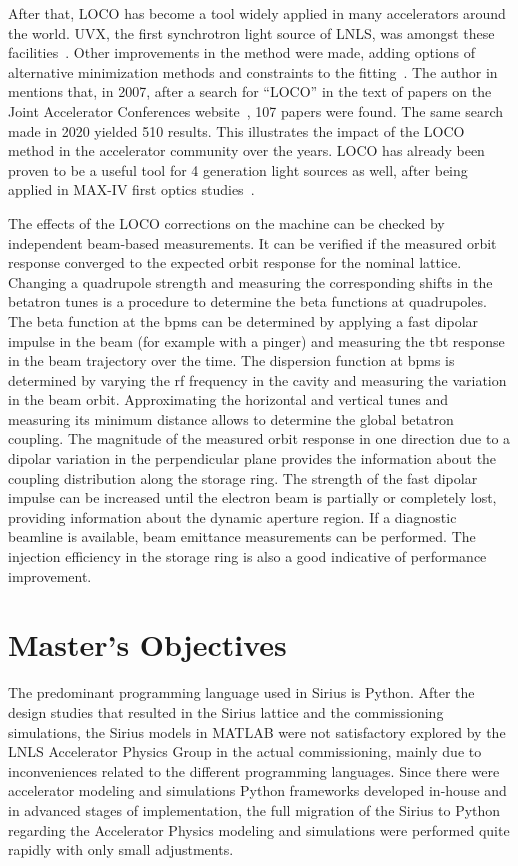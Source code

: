 After that, LOCO has become a tool widely applied in many accelerators around the world. UVX, the first synchrotron light source of LNLS, was amongst these facilities~\cite{resende2010}. Other improvements in the method were made, adding options of alternative minimization methods and constraints to the fitting~\cite{icfa_huang}. The author in~\cite{icfa_safranek} mentions that, in 2007, after a search for ``LOCO'' in the text of papers on the Joint Accelerator Conferences website~\cite{jacow}, 107 papers were found. The same search made in 2020 yielded 510 results. This illustrates the impact of the LOCO method in the accelerator community over the years. LOCO has already been proven to be a useful tool for 4 generation light sources as well, after being applied in MAX-IV first optics studies~\cite{leemann2017}.

The effects of the LOCO corrections on the machine can be checked by independent beam-based measurements. It can be verified if the measured orbit response converged to the expected orbit response for the nominal lattice. Changing a quadrupole strength and measuring the corresponding shifts in the betatron tunes is a procedure to determine the beta functions at quadrupoles. The beta function at the \glspl{bpm} can be determined by applying a fast dipolar impulse in the beam (for example with a pinger) and measuring the \gls{tbt} response in the beam trajectory over the time. The dispersion function at \glspl{bpm} is determined by varying the \gls{rf} frequency in the cavity and measuring the variation in the beam orbit. Approximating the horizontal and vertical tunes and measuring its minimum distance allows to determine the global betatron coupling. The magnitude of the measured orbit response in one direction due to a dipolar variation in the perpendicular plane provides the information about the coupling distribution along the storage ring. The strength of the fast dipolar impulse can be increased until the electron beam is partially or completely lost, providing information about the dynamic aperture region. If a diagnostic beamline is available, beam emittance measurements can be performed. The injection efficiency in the storage ring is also a good indicative of performance improvement.
\section{Master's Objectives}\label{sec:master_obj}
The predominant programming language used in Sirius is Python. After the design studies that resulted in the Sirius lattice and the commissioning simulations, the Sirius models in MATLAB were not satisfactory explored by the LNLS Accelerator Physics Group in the actual commissioning, mainly due to inconveniences related to the different programming languages. Since there were accelerator modeling and simulations Python frameworks developed in-house and in advanced stages of implementation, the full migration of the Sirius to Python regarding the Accelerator Physics modeling and simulations were performed quite rapidly with only small adjustments.
 
